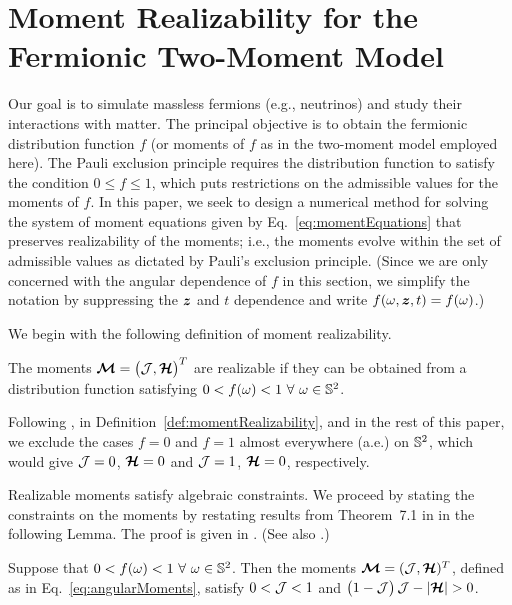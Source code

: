 \section{Moment Realizability for the Fermionic Two-Moment Model}
\label{sec:realizability}

Our goal is to simulate massless fermions (e.g., neutrinos) and study their interactions with matter.  
The principal objective is to obtain the fermionic distribution function $f$ (or moments of $f$ as in the two-moment model employed here).  
The Pauli exclusion principle requires the distribution function to satisfy the condition $0 \le f \le 1$, which puts restrictions on the admissible values for the moments of $f$.  
In this paper, we seek to design a numerical method for solving the system of moment equations given by Eq.~\eqref{eq:momentEquations} that preserves realizability of the moments; i.e., the moments evolve within the set of admissible values as dictated by Pauli's exclusion principle.  
(Since we are only concerned with the angular dependence of $f$ in this section, we simplify the notation by suppressing the $\boldsymbol{z}$ and $t$ dependence and write $f(\omega,\boldsymbol{z},t)=f(\omega)$.)  

We begin with the following definition of moment realizability.  
\begin{define}
  The moments $\boldsymbol{\mathcal{M}}=\big(\mathcal{J},\boldsymbol{\mathcal{H}}\big)^{T}$ are realizable if they can be obtained from a distribution function satisfying $0 < f(\omega) < 1~\forall~\omega\in\mathbb{S}^{2}$.
  \label{def:momentRealizability}
\end{define}
\begin{rem}
  Following \cite{lareckiBanach_2011}, in Definition~\ref{def:momentRealizability}, and in the rest of this paper, we exclude the cases $f=0$ and $f=1$ almost everywhere (a.e.) on $\mathbb{S}^{2}$, which would give $\mathcal{J}=0$, $\boldsymbol{\mathcal{H}}=0$ and $\mathcal{J}=1$, $\boldsymbol{\mathcal{H}}=0$, respectively.  
\end{rem}

Realizable moments satisfy algebraic constraints.  
We proceed by stating the constraints on the moments by restating results from Theorem~7.1 in \cite{banachLarecki_2017a} in the following Lemma.  
The proof is given in \cite{banachLarecki_2017a}.  
(See also \cite{lareckiBanach_2011,banachLarecki_2013}.)
\begin{lemma}
  Suppose that $0 < f(\omega) < 1~\forall~\omega\in\mathbb{S}^{2}$.  
  Then the moments $\boldsymbol{\mathcal{M}}=(\mathcal{J},\boldsymbol{\mathcal{H}})^{T}$, defined as in Eq.~\eqref{eq:angularMoments}, satisfy $0 < \mathcal{J} < 1$ and $\big(1-\mathcal{J}\big)\,\mathcal{J}-|\boldsymbol{\mathcal{H}}| > 0$. 
  \label{lem:MomentRealizable} 
\end{lemma}

